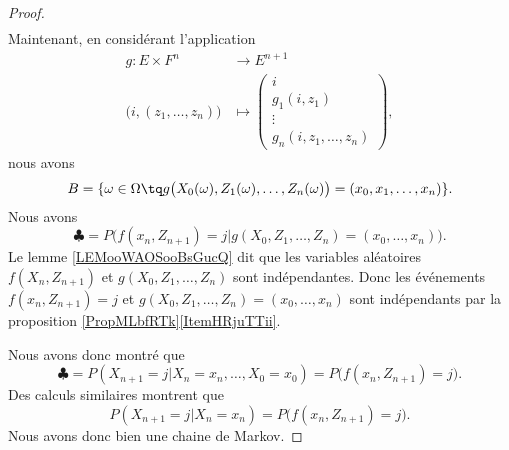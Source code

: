 \begin{proof}
\begin{subequations}
\begin{align}
		\end{align}
	\end{subequations}
	Maintenant, en considérant l'application
	\begin{equation}
		\begin{aligned}
			g\colon E\times F^n             & \to E^{n+1}                   \\
			\big( i,(z_1,\ldots, z_n) \big) & \mapsto \begin{pmatrix}
				                                          i          \\
				                                          g_1(i,z_1) \\
				                                          \vdots     \\
				                                          g_n(i,z_1,\ldots, z_n)
			                                          \end{pmatrix},
		\end{aligned}
	\end{equation}
	nous avons
	\begin{equation}
		B=\{ \omega\in\Omega\tq g\big( X_0(\omega), Z_1(\omega),\ldots, Z_n(\omega)  \big)=(x_0,x_1,\ldots, x_n) \}.
	\end{equation}
	Nous avons
	\begin{equation}
		\clubsuit=P\big( f(x_n,Z_{n+1})=j|g(X_0,Z_1,\ldots, Z_n)=(x_0,\ldots, x_n) \big).
	\end{equation}
	Le lemme \ref{LEMooWAOSooBsGucQ} dit que les variables aléatoires \( f(X_n, Z_{n+1})\) et \( g(X_0,Z_1,\ldots, Z_n)\) sont indépendantes. Donc les événements \( f(x_n,Z_{n+1})=j\) et \( g(X_0,Z_1,\ldots, Z_n)=(x_0,\ldots, x_n)\) sont indépendants par la proposition \ref{PropMLbfRTk}\ref{ItemHRjuTTii}.

	Nous avons donc montré que
	\begin{equation}
		\clubsuit=P(X_{n+1}=j|X_n=x_n,\ldots, X_0=x_0)=P\big( f(x_n,Z_{n+1})=j \big).
	\end{equation}
	Des calculs similaires montrent que
	\begin{equation}
		P(X_{n+1}=j|X_n=x_n)=P\big( f(x_n,Z_{n+1})=j \big).
	\end{equation}
	Nous avons donc bien une chaine de Markov.


\end{proof}
